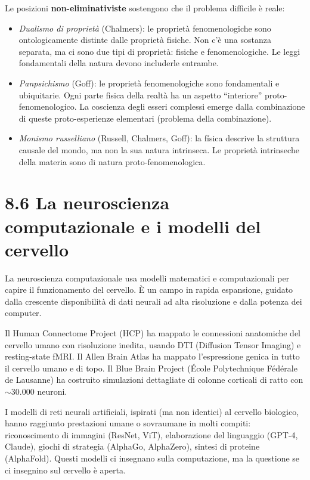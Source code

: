 \documentclass[11.5pt,a4paper,openany]{book}
\theoremstyle{remark}
\begin{document}
Le posizioni \textbf{non-eliminativiste} sostengono che il problema difficile è reale:
\begin{itemize}
\item \textit{Dualismo di proprietà} (Chalmers): le proprietà fenomenologiche sono ontologicamente distinte dalle proprietà fisiche. Non c'è una sostanza separata, ma ci sono due tipi di proprietà: fisiche e fenomenologiche. Le leggi fondamentali della natura devono includerle entrambe.
\item \textit{Panpsichismo} (Goff): le proprietà fenomenologiche sono fondamentali e ubiquitarie. Ogni parte fisica della realtà ha un aspetto ``interiore'' proto-fenomenologico. La coscienza degli esseri complessi emerge dalla combinazione di queste proto-esperienze elementari (problema della combinazione).
\item \textit{Monismo russelliano} (Russell, Chalmers, Goff): la física descrive la struttura causale del mondo, ma non la sua natura intrinseca. Le proprietà intrinseche della materia sono di natura proto-fenomenologica.
\end{itemize}

\section{8.6 La neuroscienza computazionale e i modelli del cervello}

La neuroscienza computazionale usa modelli matematici e computazionali per capire il funzionamento del cervello. È un campo in rapida espansione, guidato dalla crescente disponibilità di dati neurali ad alta risoluzione e dalla potenza dei computer.

Il Human Connectome Project (HCP) ha mappato le connessioni anatomiche del cervello umano con risoluzione inedita, usando DTI (Diffusion Tensor Imaging) e resting-state fMRI. Il Allen Brain Atlas ha mappato l'espressione genica in tutto il cervello umano e di topo. Il Blue Brain Project (École Polytechnique Fédérale de Lausanne) ha costruito simulazioni dettagliate di colonne corticali di ratto con $\sim 30.000$ neuroni.

I modelli di reti neurali artificiali, ispirati (ma non identici) al cervello biologico, hanno raggiunto prestazioni umane o sovraumane in molti compiti: riconoscimento di immagini (ResNet, ViT), elaborazione del linguaggio (GPT-4, Claude), giochi di strategia (AlphaGo, AlphaZero), sintesi di proteine (AlphaFold). Questi modelli ci insegnano sulla computazione, ma la questione se ci insegnino sul cervello è aperta.
\end{document}
